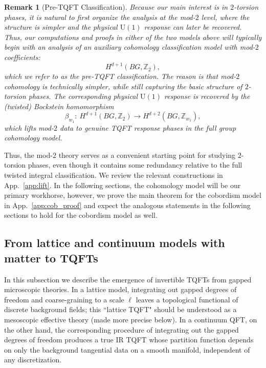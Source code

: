 \documentclass[aps,prx,reprint,superscriptaddress,twocolumn,amsmath,amssymb,amsfonts, nofootinbib]{revtex4-2}
\newcommand{\U}{\text{U}}
\newcommand{\Z}{\mathbb{Z}}
\theoremstyle{apsstyle}
\newtheorem{remark}[theorem]{Remark}
\begin{document}
\begin{remark}[Pre-TQFT Classification]
Because our main interest is in $2$-torsion phases, it is natural to first organize the analysis at the mod-$2$ level, where the structure is simpler and the physical $\U(1)$ response can later be recovered. Thus, our computations and proofs in either of the two models above will typically begin with an analysis of an auxiliary cohomology classification model with mod-$2$ coefficients: 
\begin{equation}
  H^{d+1}(BG,\mathbb Z_{2}),
\label{eq:preTQFT}
\end{equation}
which we refer to as the \emph{pre-TQFT} classification. The reason is that mod-$2$ cohomology is technically simpler, while still capturing the basic structure of $2$-torsion phases. The corresponding physical $\U(1)$ response is recovered by the (twisted) Bockstein homomorphism
\begin{equation*}
\beta_{w_{1}}:\ H^{d+1}(BG,\mathbb Z_{2})\to H^{d+2}(BG,\Z_{w_{1}}),
\end{equation*}
which lifts mod-$2$ data to genuine TQFT response phases in the full group cohomology model. 
\end{remark}

Thus, the mod-$2$ theory serves as a convenient starting point for studying $2$-torsion phases, even though it contains some redundancy relative to the full twisted integral classification. We review the relevant constructions in App.~\ref{app:lift}. In the following sections, the cohomology model will be our primary workhorse, however, we prove the main theorem for the cobordism model in App.~\ref{app:cob_proof} and expect the analogous statements in the following sections to hold for the cobordism model as well.

\subsection{From lattice and continuum models with matter to TQFTs}
\label{sec:scales}

In this subsection we describe the emergence of invertible TQFTs from gapped microscopic theories. In a lattice model, integrating out gapped degrees of freedom and coarse-graining to a scale $\ell$ leaves a topological functional of discrete background fields; this ``lattice TQFT" should be understood as a mesoscopic effective theory (made more precise below). In a continuum QFT, on the other hand, the corresponding procedure of integrating out the gapped degrees of freedom produces a true IR TQFT whose partition function depends on only the background tangential data on a smooth manifold, independent of any discretization.
\end{document}
